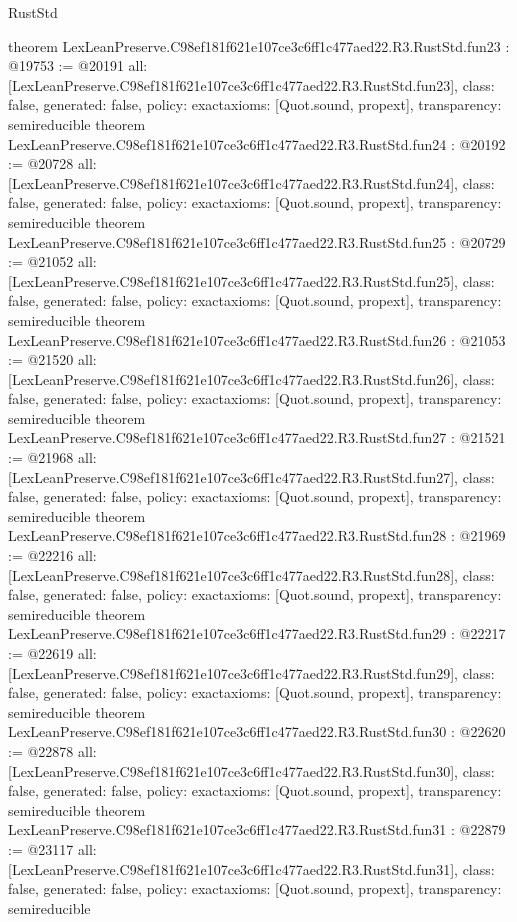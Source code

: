 \begin{lexlean}{RustStd}
\begin{coremodule}
{}
theorem LexLeanPreserve.C98ef181f621e107ce3c6ff1c477aed22.R3.RustStd.fun23 : @19753 := @20191 {
  all: [LexLeanPreserve.C98ef181f621e107ce3c6ff1c477aed22.R3.RustStd.fun23],
  class: false,
  generated: false,
  policy: exact{axioms: [Quot.sound, propext]},
  transparency: semireducible
}
theorem LexLeanPreserve.C98ef181f621e107ce3c6ff1c477aed22.R3.RustStd.fun24 : @20192 := @20728 {
  all: [LexLeanPreserve.C98ef181f621e107ce3c6ff1c477aed22.R3.RustStd.fun24],
  class: false,
  generated: false,
  policy: exact{axioms: [Quot.sound, propext]},
  transparency: semireducible
}
theorem LexLeanPreserve.C98ef181f621e107ce3c6ff1c477aed22.R3.RustStd.fun25 : @20729 := @21052 {
  all: [LexLeanPreserve.C98ef181f621e107ce3c6ff1c477aed22.R3.RustStd.fun25],
  class: false,
  generated: false,
  policy: exact{axioms: [Quot.sound, propext]},
  transparency: semireducible
}
theorem LexLeanPreserve.C98ef181f621e107ce3c6ff1c477aed22.R3.RustStd.fun26 : @21053 := @21520 {
  all: [LexLeanPreserve.C98ef181f621e107ce3c6ff1c477aed22.R3.RustStd.fun26],
  class: false,
  generated: false,
  policy: exact{axioms: [Quot.sound, propext]},
  transparency: semireducible
}
theorem LexLeanPreserve.C98ef181f621e107ce3c6ff1c477aed22.R3.RustStd.fun27 : @21521 := @21968 {
  all: [LexLeanPreserve.C98ef181f621e107ce3c6ff1c477aed22.R3.RustStd.fun27],
  class: false,
  generated: false,
  policy: exact{axioms: [Quot.sound, propext]},
  transparency: semireducible
}
theorem LexLeanPreserve.C98ef181f621e107ce3c6ff1c477aed22.R3.RustStd.fun28 : @21969 := @22216 {
  all: [LexLeanPreserve.C98ef181f621e107ce3c6ff1c477aed22.R3.RustStd.fun28],
  class: false,
  generated: false,
  policy: exact{axioms: [Quot.sound, propext]},
  transparency: semireducible
}
theorem LexLeanPreserve.C98ef181f621e107ce3c6ff1c477aed22.R3.RustStd.fun29 : @22217 := @22619 {
  all: [LexLeanPreserve.C98ef181f621e107ce3c6ff1c477aed22.R3.RustStd.fun29],
  class: false,
  generated: false,
  policy: exact{axioms: [Quot.sound, propext]},
  transparency: semireducible
}
theorem LexLeanPreserve.C98ef181f621e107ce3c6ff1c477aed22.R3.RustStd.fun30 : @22620 := @22878 {
  all: [LexLeanPreserve.C98ef181f621e107ce3c6ff1c477aed22.R3.RustStd.fun30],
  class: false,
  generated: false,
  policy: exact{axioms: [Quot.sound, propext]},
  transparency: semireducible
}
theorem LexLeanPreserve.C98ef181f621e107ce3c6ff1c477aed22.R3.RustStd.fun31 : @22879 := @23117 {
  all: [LexLeanPreserve.C98ef181f621e107ce3c6ff1c477aed22.R3.RustStd.fun31],
  class: false,
  generated: false,
  policy: exact{axioms: [Quot.sound, propext]},
  transparency: semireducible
}
\end{coremodule}
\end{lexlean}
